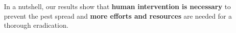 \begin{enumerate}[\quad\bf1.]
\end{enumerate}

In a nutshell, our results show that \textbf{human intervention is necessary} to prevent the pest spread and \textbf{more efforts and resources} are needed for a thorough eradication.
